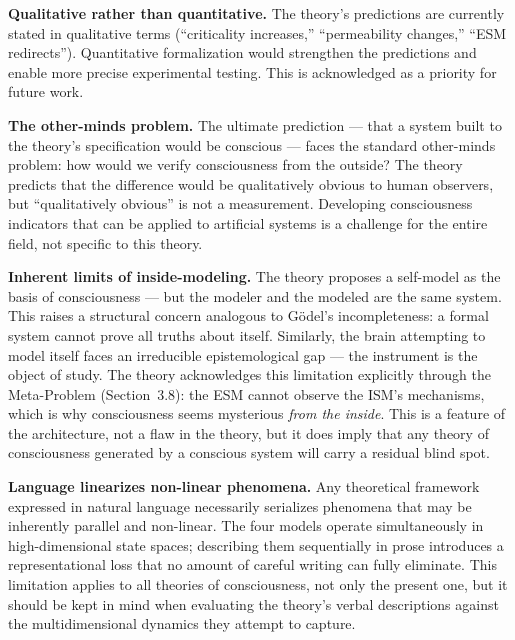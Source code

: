 \documentclass[12pt]{article}
\begin{document}
\textbf{Qualitative rather than quantitative.} The theory's predictions are currently stated in qualitative terms (``criticality increases,'' ``permeability changes,'' ``ESM redirects''). Quantitative formalization would strengthen the predictions and enable more precise experimental testing. This is acknowledged as a priority for future work.

\textbf{The other-minds problem.} The ultimate prediction --- that a system built to the theory's specification would be conscious --- faces the standard other-minds problem: how would we verify consciousness from the outside? The theory predicts that the difference would be qualitatively obvious to human observers, but ``qualitatively obvious'' is not a measurement. Developing consciousness indicators that can be applied to artificial systems is a challenge for the entire field, not specific to this theory.

\textbf{Inherent limits of inside-modeling.} The theory proposes a self-model as the basis of consciousness --- but the modeler and the modeled are the same system. This raises a structural concern analogous to G{\"o}del's incompleteness: a formal system cannot prove all truths about itself. Similarly, the brain attempting to model itself faces an irreducible epistemological gap --- the instrument is the object of study. The theory acknowledges this limitation explicitly through the Meta-Problem (Section~3.8): the ESM cannot observe the ISM's mechanisms, which is why consciousness seems mysterious \emph{from the inside}. This is a feature of the architecture, not a flaw in the theory, but it does imply that any theory of consciousness generated by a conscious system will carry a residual blind spot.

\textbf{Language linearizes non-linear phenomena.} Any theoretical framework expressed in natural language necessarily serializes phenomena that may be inherently parallel and non-linear. The four models operate simultaneously in high-dimensional state spaces; describing them sequentially in prose introduces a representational loss that no amount of careful writing can fully eliminate. This limitation applies to all theories of consciousness, not only the present one, but it should be kept in mind when evaluating the theory's verbal descriptions against the multidimensional dynamics they attempt to capture.
\end{document}
